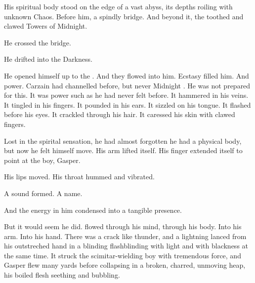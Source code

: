 

His spiritual body stood on the edge of a vast abyss, its depths roiling with unknown Chaos. 
Before him, a spindly bridge. 
And beyond it, the toothed and clawed Towers of Midnight. 



He crossed the bridge. 

He drifted into the Darkness. 

He opened himself up to the \qliphoth. 
And they flowed into him. 
Ecstasy filled him. 
And power. 
Carzain had channelled \Itzach{} before, but never Midnight \Itzach. 
He was not prepared for this. 
It was power such as he had never felt before. 
It hammered in his veins. 
It tingled in his fingers. 
It pounded in his ears. 
It sizzled on his tongue. 
It flashed before his eyes. 
It crackled through his hair. 
It caressed his skin with clawed fingers. 

Lost in the spirital sensation, he had almost forgotten he had a physical body, but now he felt himself move. 
His arm lifted itself. 
His finger extended itself to point at the boy, Gasper. 

His lips moved. 
His throat hummed and vibrated. 

A sound formed. 
A name. 


And the \Itzach{} energy in him condensed into a tangible presence. 

But it would seem he did. 
\Nyxachel{} flowed through his mind, through his body. 
Into his arm. 
Into his hand. 
There was a crack like thunder, and a lightning lanced from his outstreched hand in a blinding flash\dash blinding with light and with blackness at the same time. 
It struck the scimitar-wielding boy with tremendous force, and Gasper flew many yards before collapsing in a broken, charred, unmoving heap, 
his boiled flesh seething and bubbling. 

